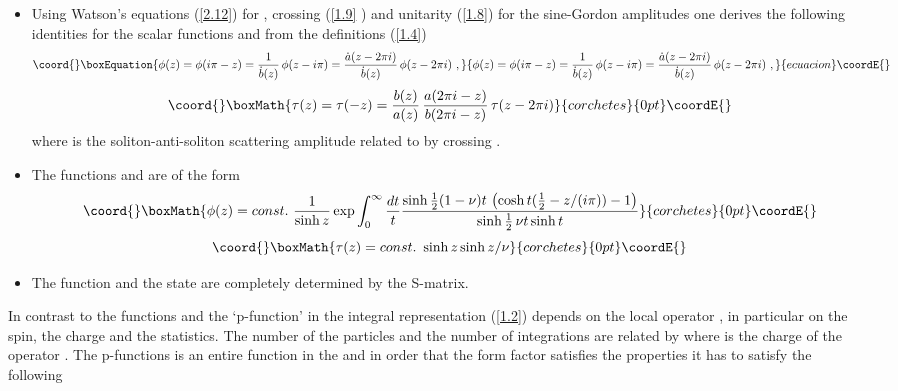 \documentclass[a4paper,a4paper]{article}
\begin{document}
\begin{itemize}
\item  Using Watson's equations (\ref{2.12}) for \coordHE{}, crossing (\ref{1.9}%
) and unitarity (\ref{1.8}) for the sine-Gordon amplitudes one derives the
following identities for the scalar functions \coordHE{} and \coordHE{} from
the definitions (\ref{1.4}) 
\begin{equation}\coord{}\boxEquation{
\phi (z)=\phi (i\pi -z)=\frac{1}{\dot{b}(z)}\,\phi (z-i\pi )=\frac{\dot{a}
(z-2\pi i)}{\dot{b}(z)}\,\phi (z-2\pi i)~,  \label{1.6}
}{
\phi (z)=\phi (i\pi -z)=\frac{1}{\dot{b}(z)}\,\phi (z-i\pi )=\frac{\dot{a}
(z-2\pi i)}{\dot{b}(z)}\,\phi (z-2\pi i)~,  }{ecuacion}\coordE{}\end{equation}
\[\coord{}\boxMath{
\tau (z)=\tau (-z)=\frac{b(z)}{a(z)}\,\frac{a(2\pi i-z)}{b(2\pi i-z)}\,\tau
(z-2\pi i) 
}{corchetes}{0pt}\coordE{}\]
where \coordHE{} is the soliton-anti-soliton scattering amplitude related to \coordHE{} by crossing \coordHE{}.

\item  The functions \coordHE{} and \coordHE{} are of the form 
\[\coord{}\boxMath{
\phi (z)=const.~\frac{1}{\sinh z}\exp \int_{0}^{\infty }\frac{dt}{t}\frac{%
\sinh \frac{1}{2}(1-\nu )t\,\left( \cosh t(\frac{1}{2}-z/(i\pi ))-1\right) }{%
\sinh \frac{1}{2}\,\nu t\sinh t} 
}{corchetes}{0pt}\coordE{}\]
\[\coord{}\boxMath{
\tau (z)=const.~\sinh z\sinh z/\nu 
}{corchetes}{0pt}\coordE{}\]

\item  The function \coordHE{} and the state \coordHE{} are completely
determined by the S-matrix.
\end{itemize}

In contrast to the functions \coordHE{} and \coordHE{} the `p-function' 
\coordHE{} in the integral
representation (\ref{1.2}) depends on the local operator \coordHE{},
in particular on the spin, the charge and the statistics. The number of the
particles \coordHE{} and the number of integrations \coordHE{} are related by \coordHE{}
where \coordHE{} is the charge of the operator \coordHE{}. The p-functions is
an entire function in the \coordHE{} and in order that the form
factor satisfies the properties \coordHE{} it has to satisfy the following
\end{document}
